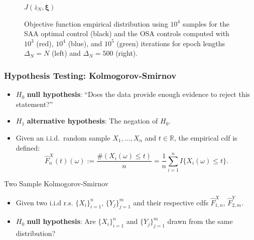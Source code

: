 \documentclass[aspectratio=169,xcolor=dvipsnames,11pt]{beamer}
\newcommand{\xibold}{\mathbold{\xi}}
\begin{document}
\begin{footnotesize}
\begin{frame}
\begin{figure}[!ht]
\begin{minipage}{0.49\textwidth}
  $J(\bar{z}_N,\xibold)$
\end{minipage}
  \caption{\tiny Objective function empirical distribution using $10^4$ samples
           for the SAA optimal
	   control (black) and the OSA controls computed with $10^3$ (red),
           $10^4$ (blue), and $10^5$ (green) iterations for epoch lengths
           $\Delta_N=N$ (left) and $\Delta_N=500$ (right).}
  \label{fig:objective_cdf}
\end{figure}
\end{frame}

\begin{frame}\frametitle{Hypothesis Testing: Kolmogorov-Smirnov}
\begin{block}{}
\begin{itemize}
\item $H_0$ \textbf{null hypothesis}: ``Does the data provide enough evidence to reject this statement?''
\item $H_1$ \textbf{alternative hypothesis}: The negation of $H_0$. \pause
\end{itemize}
\end{block}

\begin{block}{}
\begin{itemize}
\item Given an i.i.d.\ random sample $X_1,\dots,X_n$ and $t \in \mathbb R$, the empirical cdf is defined:
\[
\widehat{F}^{X}_{n}(t)(\omega) := \frac{\# (X_i(\omega) \le t)}{n} = \frac{1}{n} \sum_{i=1}^n I\{X_i(\omega) \le t\}.
\]
\end{itemize}
\end{block}\pause

\begin{block}{Two Sample Kolmogorov-Smirnov}
\begin{itemize}
\item Given two i.i.d r.s. $\{X_i\}_{i=1}^n$, $\{Y_j\}_{j=1}^m$ and their respective cdfs $\widehat{F}^X_{1,n}$, $\widehat{F}^Y_{2,m}$.
\item $H_0$ \textbf{null hypothesis}: 
 Are $\{X_i\}_{i=1}^n$ and $\{Y_j\}_{j=1}^m$ drawn from the same distribution?
\end{itemize}
\end{block}
\end{frame}


\end{footnotesize}
\end{document}
